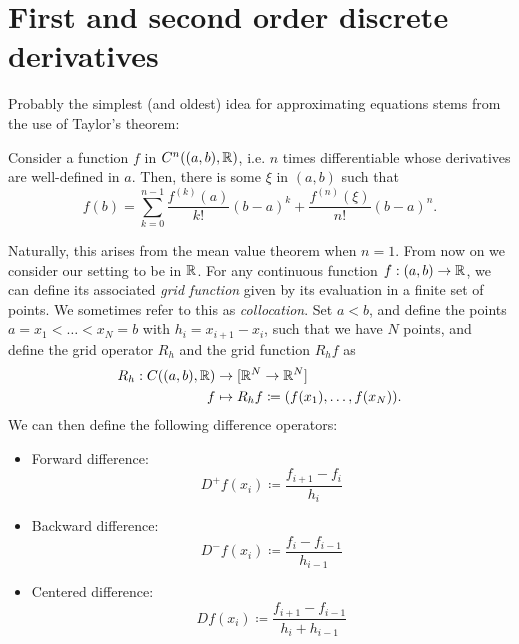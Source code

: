 \section{First and second order discrete derivatives}\label{sec:first-second-fd}
Probably the simplest (and oldest) idea for approximating equations stems from the use of Taylor's theorem:
\begin{theorem}\label{thm:taylor}
    Consider a function $f$ in $C^n((a,b), \mathbb{R})$, i.e. $n$ times differentiable whose derivatives are well-defined in $a$. Then, there is some $\xi$ in $(a,b)$ such that
    \begin{equation}
        f(b) = \sum_{k=0}^{n-1}\frac{f^{(k)}(a)}{k!}(b-a)^k + \frac{f^{(n)}(\xi)}{n!}(b-a)^n.
    \end{equation}
\end{theorem}
Naturally, this arises from the mean value theorem when $n=1$. From now on we consider our setting to be in $\mathbb{R}$. For any continuous function $f:(a,b)\to \mathbb{R}$, we can define its associated \emph{grid function} given by its evaluation in a finite set of points. We sometimes refer to this as \emph{collocation}. Set $a<b$, and define the points $a=x_1<\hdots<x_N=b$ with $h_i=x_{i+1}-x_{i}$, such that we have $N$ points, and define the grid operator $R_h$ and the grid function $R_h f$ as
\begin{equation}\label{eq:def-grid-function}
    \begin{aligned}
        R_h:C((a,b),\mathbb{R})&\to [\mathbb{R}^N\to \mathbb{R}^N]\\
        f &\mapsto R_h f \coloneqq (f(x_1), \dots, f(x_N)).
    \end{aligned}
\end{equation}
We can then define the following difference operators: 
\begin{itemize}
    \item Forward difference: 
    \begin{equation*}
        D^+f(x_i) \coloneqq \frac{f_{i+1} - f_i}{h_{i}}
    \end{equation*}
    \item Backward difference: 
    \begin{equation*}
        D^-f(x_i) \coloneqq \frac{f_{i} - f_{i-1}}{h_{i-1}}
    \end{equation*}
    \item Centered difference:
    \begin{equation*}
        Df(x_i) \coloneqq \frac{f_{i+1} - f_{i-1}}{h_{i} + h_{i-1}}
    \end{equation*}
\end{itemize}
